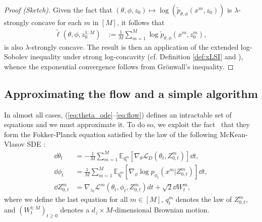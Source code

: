 \documentclass[twoside]{article}
\begin{document}
\begin{proof}[Proof (Sketch)]
Given the fact that $(\theta,\phi,z_0)\mapsto \log(\tilde{p}_{\theta,\phi}(x^m,z_0))$ is $\lambda$-strongly concave for each $m$ in $[M]$, it follows that
\begin{align}
\tilde{\ell}(\theta,\phi,z_0^{1:M})
&:=\frac{1}{M}\sum_{m=1}^M\log\tilde{p}_{\theta,\phi}(x^m,z_0^m),\label{eq:tilde-ell}
\end{align}
is also $\lambda$-strongly concave. The result is then an application of the extended log-Sobolev inequality under strong log-concavity (cf. Definition \ref{def:xLSI} and \citet{caprioerrorboundsparticle2024}), whence the exponential convergence follows from Gr{\"o}nwall's inequality.
\end{proof}

\subsection{Approximating the flow and a simple algorithm}
\label{sec:practical_disc}
In almost all cases, (\ref{eq:theta_ode}--\ref{eq:flow}) defines an intractable set of equations and we must approximate it. To do so, we exploit the fact~\cite[Section~2]{kuntz23a} that they form the Fokker-Planck equation satisfied by the law of the following McKean-Vlasov SDE \citep{chaintron_2022}:
\begin{align}
\dd {\theta}_t &= -\frac{1}{M}\sum_{m=1}^M\mathbb{E}_{q^m_t}\left[\nabla_{\theta} \mathcal{L}_D(\theta_t, Z_{0,t}^m)\right] \dd t, \label{eq:gf_theta_ode} \\
    \dd {\phi}_t &= \frac{1}{M}\sum_{m=1}^M\mathbb{E}_{q^m_t}\left[\nabla_{\phi} \log p_{\phi_t}( x^m | Z_{0,t}^m)\right] \dd t, \\
    \dd Z_{0,t}^m &= \nabla_{z_{0}} \mathcal{L}^m(\theta_t, \phi_t, {Z}_{0,t}^m)dt+\sqrt{{2}} \dd W_{t}^m, \label{eq:gf_z_sde}
\end{align}
where we define the last equation for all $m\in [M]$, $q_t^m$ denotes the law of $Z_{0,t}^m$, and $(W_t^{1:M})_{t\geq 0}$ denotes a $d_z\times M$-dimensional Brownian motion. 
\end{document}

